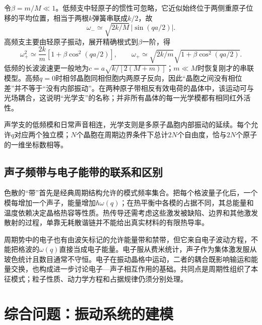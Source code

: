 令$\beta=m/M\ll1$。低频支中轻原子的惯性可忽略，它近似始终位于两侧重原子位移的平均位置，相当于两根$k$弹簧串联成$k/2$，故
\[
 \omega_-\simeq\sqrt{2k/M}\,|\sin(qa/2)|.
\]
高频支主要由轻原子振动，展开精确根式到$\beta$一阶，得
\[
 \omega_+^2\simeq\frac{2k}{m}\left[1+\beta\cos^2(qa/2)\right],
 \qquad\omega_+\simeq\sqrt{2k/m}\sqrt{1+\beta\cos^2(qa/2)}.
\]
低频的长波波速更一般地为$c=a\sqrt{k/[2(M+m)]}$；$m\ll M$时恢复刚才的串联模型。高频$q=0$时相邻晶胞同相但胞内两原子反向，因此“晶胞之间没有相位差”并不等于“没有内部振动”。在两种原子带相反有效电荷的晶体中，该运动可与光场耦合，这说明“光学支”的名称；并非所有晶体的每一光学模都有相同红外活性。

声学支的低频模和日常声音相连，光学支则是多原子晶胞内部振动的延续。每个允许$q$对应两个独立模；$N$个晶胞在周期边界条件下总计$2N$个自由度，恰与$2N$个原子的一维坐标数相等。

\subsection{声子频带与电子能带的联系和区别}
色散的“带”首先是经典周期结构允许的模式频率集合。把每个格波量子化后，一个模每增加一个声子，能量增加$\hbar\omega(q)$；在热平衡中各模的占据不同，其总能量和温度依赖决定晶格热容等性质。热传导还需考虑这些激发被缺陷、边界和其他激发散射的过程，单靠无耗散谐链并不能给出真实材料的有限热导率。

周期势中的电子也有由波矢标记的允许能量带和禁带，但它来自电子波动方程，不能把格波的$\omega(q)$直接当成电子能量。电子服从费米统计，声子作为集体激发服从玻色统计且数目通常不守恒。电子在振动晶格中运动，二者的耦合既影响输运和能量交换，也构成进一步讨论电子—声子相互作用的基础。共同点是周期性组织了本征模式；粒子性质、动力学方程和占据规律仍须分别处理。


\section{综合问题：振动系统的建模}

